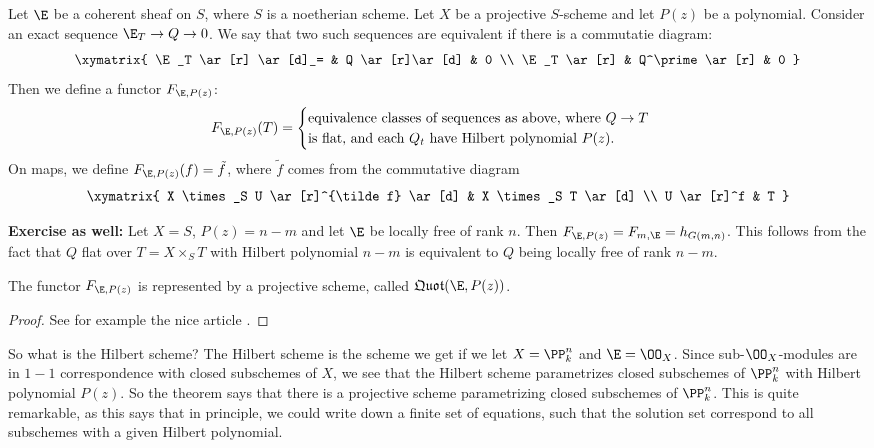 \documentclass[11pt, english]{article}
\begin{document}
Let $\E$ be a coherent sheaf on $S$, where $S$ is a noetherian scheme. Let $X$ be a projective $S$-scheme and let $P(z)$ be a polynomial. Consider an exact sequence $\E_T \to Q \to 0$. We say that two such sequences are equivalent if there is a commutatie diagram:
\[
\xymatrix{
\E_T \ar[r] \ar[d]_= & Q \ar[r]\ar[d] & 0 \\
\E_T \ar[r] & Q^\prime \ar[r] & 0 
}
\]
Then we define a functor $F_{\E, P(z)}$:
\[
F_{\E,P(z)}(T) = \begin{cases}
\text{equivalence classes of sequences as above, where $Q\to T$}\\
\text{is flat, and each $Q_t$ have Hilbert polynomial $P(z)$.}
\end{cases}
\]
On maps, we define $F_{\E, P(z)}(f)=\tilde{f}$, where $\tilde f$ comes from the commutative diagram
\[
\xymatrix{
X \times_S U \ar[r]^{\tilde f} \ar[d] & X \times_S T \ar[d] \\
U \ar[r]^f & T
} 
\]


\begin{example}\textbf{Exercise as well:} Let $X=S$, $P(z)=n-m$ and let $\E$ be locally free of rank $n$. Then $F_{\E,P(z)}=F_{m,\E}=h_{G(m,n)}$. This follows from the fact that $Q$ flat over $T=X \times_S T$ with Hilbert polynomial $n-m$ is equivalent to $Q$ being locally free of rank $n-m$.
\end{example}

\begin{thm}[Grothendieck]
The functor $F_{\E,P(z)}$ is represented by a projective scheme, called $\mathfrak{Quot}(\E,P(z))$.
\end{thm}
\begin{proof}
See for example the nice article \cite{nitsure_hilbert}. 
\end{proof}  

So what is the Hilbert scheme? The Hilbert scheme is the scheme we get if we let $X=\PP_k^n$ and $\E = \OO_X$. Since sub-$\OO_X$-modules are in $1-1$ correspondence with closed subschemes of $X$, we see that the Hilbert scheme parametrizes closed subschemes of $\PP_k^n$ with Hilbert polynomial $P(z)$. So the theorem says that there is a projective scheme parametrizing closed subschemes of $\PP_k^n$. This is quite remarkable, as this says that in principle, we could write down a finite set of equations, such that the solution set correspond to all subschemes with a given Hilbert polynomial.



\pagebreak
\end{document}
